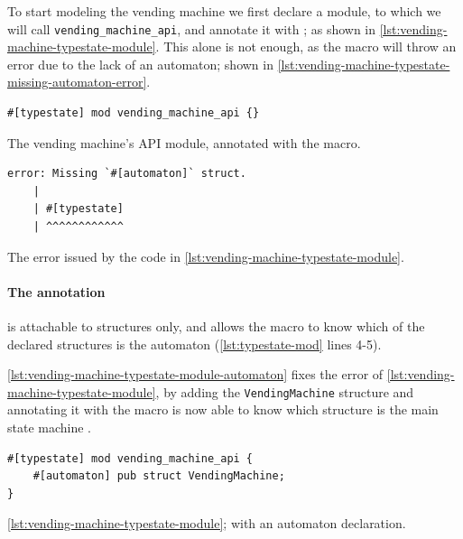 To start modeling the vending machine we first declare a module, to which we will call \texttt{vending\_machine\_api},
and annotate it with \textcolor{attrgreen}{}; as shown in \autoref{lst:vending-machine-typestate-module}.
This alone is not enough, as the macro will throw an error due to the lack of an automaton; shown in \autoref{lst:vending-machine-typestate-missing-automaton-error}.

\begin{listing}
    \begin{verbatim}
#[typestate] mod vending_machine_api {}
    \end{verbatim}
    \caption{The vending machine's \gls{API} module, annotated with the \textcolor{attrgreen}{} macro.}
    \label{lst:vending-machine-typestate-module}
\end{listing}

\begin{listing}
    \begin{verbatim}
error: Missing `#[automaton]` struct.
    |
    | #[typestate]
    | ^^^^^^^^^^^^
    \end{verbatim}
    \caption{The error issued by the code in \autoref{lst:vending-machine-typestate-module}.}
    \label{lst:vending-machine-typestate-missing-automaton-error}
\end{listing}

\paragraph{The  annotation} is attachable to structures only, %
and allows the macro to know which of the declared structures is the automaton (\autoref{lst:typestate-mod} lines 4-5).

\autoref{lst:vending-machine-typestate-module-automaton} fixes the error of \autoref{lst:vending-machine-typestate-module},
by adding the \textcolor{structblue}{\texttt{VendingMachine}} structure and annotating it with \textcolor{attrgreen}{}
the macro is now able to know which structure is the main state machine .

\begin{listing}
    \begin{verbatim}
#[typestate] mod vending_machine_api {
    #[automaton] pub struct VendingMachine;
}
    \end{verbatim}
    \caption{\autoref{lst:vending-machine-typestate-module}; with an automaton declaration.}
    \label{lst:vending-machine-typestate-module-automaton}
\end{listing}


